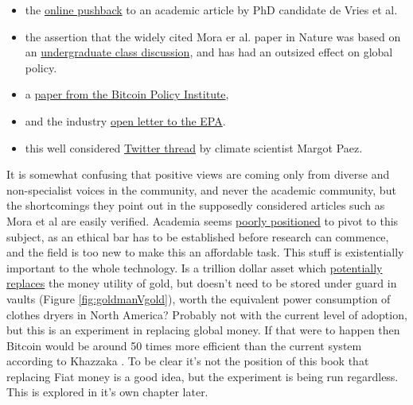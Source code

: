 \begin{itemize}
\item the \href{https://www.zerohedge.com/crypto/questionable-ethics-anti-bitcoin-esg-junk-science}{online pushback} to an academic article by PhD candidate de Vries et al. \cite{de2022revisiting}
\item the assertion that the widely cited Mora er al. paper in Nature \cite{mora2018bitcoin} was based on an \href{https://twitter.com/NateHawaii/status/1460706785216450560}{undergraduate class discussion}, and has had an outsized effect on global policy. 
\item a \href{https://rebrand.ly/v8qq1sx}{paper from the Bitcoin Policy Institute}, 
\item and the industry \href{https://bitcoinminingcouncil.com/wp-content/uploads/2022/05/Bitcoin_Letter_to_the_Environmental_Protection_Agency.pdf}{open letter to the EPA}.\par
\item this well considered \href{https://twitter.com/jyn_urso/status/1508899761319038983}{Twitter thread} by climate scientist Margot Paez.
\end{itemize}
It is somewhat confusing that positive views are coming only from diverse and non-specialist voices in the community, and never the academic community, but the shortcomings they point out in the supposedly considered articles such as Mora et al \cite{mora2018bitcoin} are easily verified. Academia seems \href{https://bitcoinmagazine.com/culture/bitcoin-could-never-be-invented-in-a-university}{poorly positioned} to pivot to this subject, as an ethical bar has to be established before research can commence, and the field is too new to make this an affordable task. This stuff is existentially important to the whole technology. Is a trillion dollar asset which \href{https://www.theheldreport.com/p/bitcoin-vs-gold}{potentially replaces} the money utility of gold, but doesn't need to be stored under guard in vaults (Figure \ref{fig:goldmanVgold}), worth the equivalent power consumption of clothes dryers in North America? Probably not with the current level of adoption, but this is an experiment in replacing global money. If that were to happen then Bitcoin would be around 50 times more efficient than the current system according to Khazzaka \cite{khazzaka2022bitcoin}. To be clear it's not the position of this book that replacing Fiat money is a good idea, but the experiment is being run regardless. This is explored in it's own chapter later.\par

